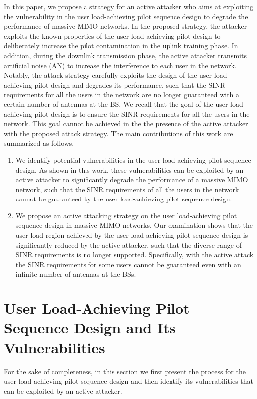 \documentclass[conference]{IEEEtran}
\begin{document}
In this paper, we propose a strategy for an active attacker who aims at exploiting the vulnerability in the user load-achieving pilot sequence design to degrade the performance of massive MIMO networks. In the proposed strategy, the attacker exploits the known properties of the user load-achieving pilot design to deliberately increase the pilot contamination in the uplink training phase. In addition, during the downlink transmission phase, the active attacker transmits artificial noise (AN) to increase the interference to each user in the network. Notably, the attack strategy carefully exploits the design of the user load-achieving pilot design and degrades its performance, such that the SINR requirements for all the users in the network are no longer guaranteed with a certain number of antennas at the BS. We recall that the goal of the user load-achieving pilot design is to ensure the SINR requirements for all the users in the network. This goal cannot be achieved in the the presence of the active attacker with the proposed attack strategy. The main contributions of this work are summarized as follows.
\begin{enumerate}
\item
We identify potential vulnerabilities in the user load-achieving pilot sequence design. As shown in this work, these vulnerabilities can be exploited by an active attacker to significantly degrade the performance of a massive MIMO network, such that the SINR requirements of all the users in the network cannot be guaranteed by the user load-achieving pilot sequence design.
\item
We propose an active attacking strategy on the user load-achieving pilot sequence design in massive MIMO networks. Our examination shows that the user load region achieved by the user load-achieving pilot sequence design  is significantly reduced by the active attacker, such that the diverse range of SINR requirements is no longer supported. Specifically, with the active attack the SINR requirements for some users cannot be guaranteed even with an infinite number of antennas at the BSs.
\end{enumerate}


\section{User Load-Achieving Pilot Sequence Design and Its Vulnerabilities}
For the sake of completeness, in this section we first present the process for the user load-achieving pilot sequence design \cite{Akbar16a,Akbar16} and then identify its vulnerabilities that can be exploited by an active attacker.
\end{document}
